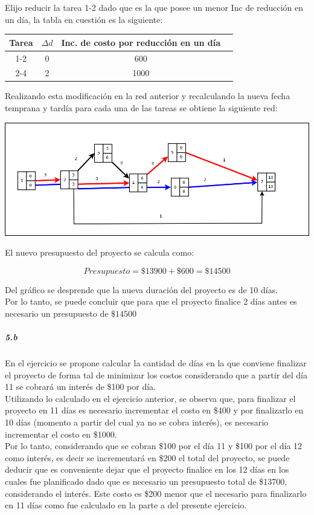 \documentclass[a4paper,10pt]{article}
\begin{document}
Elijo reducir la tarea 1-2 dado que es la que posee un menor Inc de reducci\'on en un d\'ia, la tabla en cuesti\'on es la siguiente:

   \begin{center}
   \begin{tabular}{|| c | c | c | c ||}
   \hline 
      Tarea & $\Delta d$ & Inc. de costo por reducci\'on en un d\'ia \\ \hline \hline
      1-2 & 0 & 600  \\ \hline
      2-4 & 2 & 1000  \\ \hline
   \end{tabular}
   \end{center}


Realizando esta modificaci\'on en la red anterior y recalculando la nueva fecha temprana y tard\'ia para cada una de las tareas se obtiene la siguiente red:

  \begin{center}
    \includegraphics[scale=0.4,keepaspectratio=true]{img/ej5-2red.png} 
  \end{center}

El nuevo presupuesto del proyecto se calcula como:

$$ Presupuesto = \$13900 + \$600 = \$14500 $$

Del gr\'afico se desprende que la nueva duraci\'on del proyecto es de 10 d\'ias.\\

Por lo tanto, se puede concluir que para que el proyecto finalice 2 d\'ias antes es necesario un presupuesto de $\$14500$

\subparagraph {5.b}

En el ejercicio se propone calcular la cantidad de d\'ias en la que conviene finalizar el proyecto de forma tal de minimizar los costos considerando que a partir del d\'ia 11 se cobrar\'a un inter\'es
de \$100 por d\'ia.\\
Utilizando lo calculado en el ejercicio anterior, se observa que, para finalizar el proyecto en 11 d\'ias es necesario incrementar el costo en \$400 y por finalizarlo en 10 d\'ias (momento a partir del cual ya no se 
cobra inter\'es), es necesario incrementar el costo en \$1000. \\

Por lo tanto, considerando que se cobran \$100 por el d\'ia 11 y \$100 por el d\'ia 12 como inter\'es, es decir se incrementar\'a en \$200 el total del proyecto, se puede deducir que 
es conveniente dejar que el proyecto finalice en los 12 d\'ias en los cuales fue planificado dado que es necesario un presupuesto total de \$13700, considerando el inter\'es. Este costo es 
\$200 menor que el necesario para finalizarlo en 11 d\'ias como fue calculado en la parte a del presente ejercicio.
\end{document}
